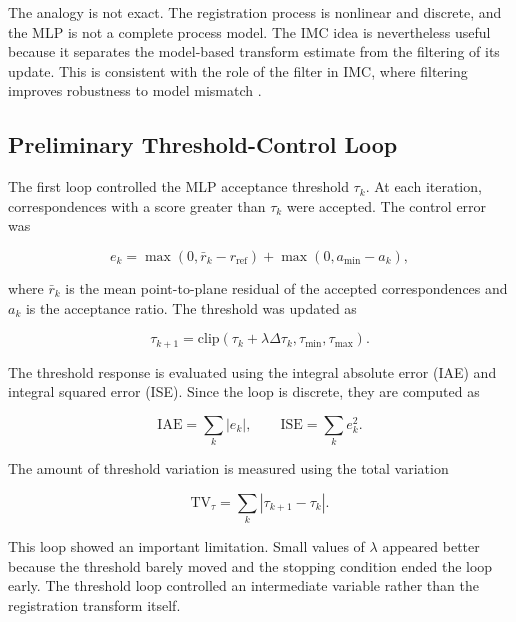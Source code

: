 \documentclass[conference]{IEEEtran}
\begin{document}
The analogy is not exact. The registration process is nonlinear and discrete, and the MLP is not a complete process model. The IMC idea is nevertheless useful because it separates the model-based transform estimate from the filtering of its update. This is consistent with the role of the filter in IMC, where filtering improves robustness to model mismatch \cite{ranjan2023imc}.

\subsection{Preliminary Threshold-Control Loop}
\label{subsec:threshold_control}

The first loop controlled the MLP acceptance threshold $\tau_k$. At each iteration, correspondences with a score greater than $\tau_k$ were accepted. The control error was

\begin{equation}
    e_k =
    \max(0,\bar{r}_k-r_{\mathrm{ref}})
    +
    \max(0,a_{\min}-a_k),
    \label{eq:threshold_error}
\end{equation}

where $\bar{r}_k$ is the mean point-to-plane residual of the accepted correspondences and $a_k$ is the acceptance ratio. The threshold was updated as

\begin{equation}
    \tau_{k+1}
    =
    \mathrm{clip}
    \left(
    \tau_k
    +
    \lambda
    \Delta \tau_k,
    \tau_{\min},
    \tau_{\max}
    \right).
    \label{eq:threshold_update}
\end{equation}

The threshold response is evaluated using the integral absolute error (IAE) and integral squared error (ISE). Since the loop is discrete, they are computed as

\begin{equation}
    \mathrm{IAE}
    =
    \sum_k |e_k|,
    \qquad
    \mathrm{ISE}
    =
    \sum_k e_k^2.
    \label{eq:iae_ise}
\end{equation}

The amount of threshold variation is measured using the total variation

\begin{equation}
    \mathrm{TV}_{\tau}
    =
    \sum_k
    |\tau_{k+1}-\tau_k|.
    \label{eq:threshold_tv}
\end{equation}

This loop showed an important limitation. Small values of $\lambda$ appeared better because the threshold barely moved and the stopping condition ended the loop early. The threshold loop controlled an intermediate variable rather than the registration transform itself.
\end{document}

